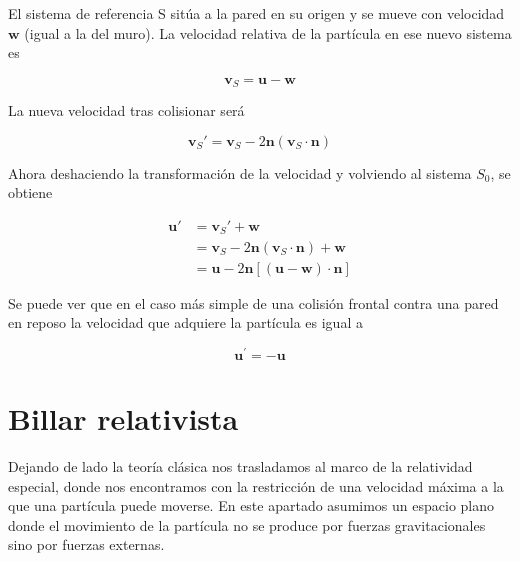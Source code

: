 \documentclass[11pt, spanish]{book}
\begin{document}
\vspace{3mm}

El sistema de referencia S sitúa a la pared en su origen y se mueve con velocidad \( \mathbf{w} \) (igual a la del muro). La velocidad relativa de la partícula en ese nuevo sistema es

\begin{equation}
    \mathbf{v}_S = \mathbf{u} - \mathbf{w}
\end{equation}

La nueva velocidad tras colisionar será

\begin{equation}
    \mathbf{v}_S' = \mathbf{v}_S - 2\mathbf{n}(\mathbf{v}_S \cdot \mathbf{n})
\end{equation}

Ahora deshaciendo la transformación de la velocidad y volviendo al sistema \( S_0 \), se obtiene

\begin{align}
    \mathbf{u}' &= \mathbf{v}_S' + \mathbf{w} \\
    &= \mathbf{v}_S - 2\mathbf{n}(\mathbf{v}_S \cdot \mathbf{n}) + \mathbf{w} \\
    &= \mathbf{u} - 2\mathbf{n}\left[(\mathbf{u} - \mathbf{w}) \cdot \mathbf{n}\right]
\end{align}

\vspace{3mm}

Se puede ver que en el caso más simple de una colisión frontal contra una pared en reposo la velocidad que adquiere la partícula es igual a 

\begin{equation}\label{eq:velocidad_inversa_clasica}
    \mathbf{u}^\prime = - \mathbf{u}
\end{equation}

\section{Billar relativista}

Dejando de lado la teoría clásica nos trasladamos al marco de la relatividad especial, donde nos encontramos con la restricción de una velocidad máxima a la que una partícula puede moverse. En este apartado asumimos un espacio plano donde el movimiento de la partícula no se produce por fuerzas gravitacionales sino por fuerzas externas. 

\vspace{3mm}
\end{document}
